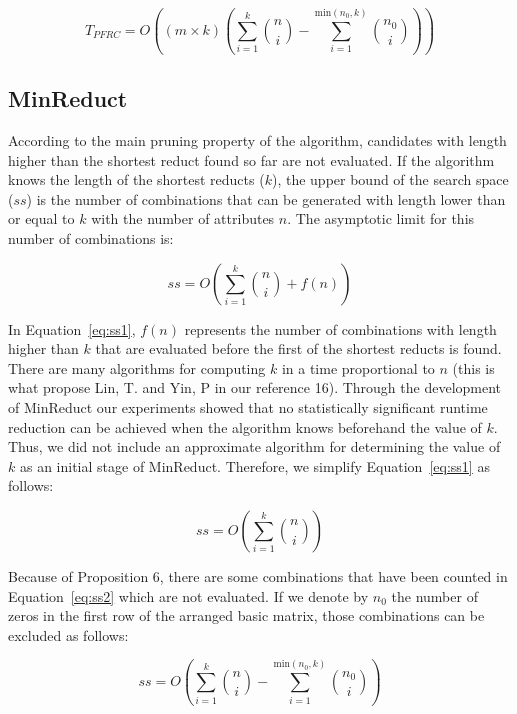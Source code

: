 \documentclass[citenumber]{llncs}
\begin{document}
	\begin{equation}
	T_{PFRC} = O\left((m\times k)\left(\sum_{i=1}^{k} \binom{n}{i} - \sum_{i=1}^{\mathrm{min}(n_0,k)} \binom{n_0}{i}\right)\right)\label{eq:complexPFRC}
	\end{equation}

%	
\subsection{MinReduct}	
%		
	 According to the main pruning property of the algorithm, candidates with length higher than the shortest reduct found so far are not evaluated. If the algorithm knows the length of the shortest reducts ($k$), the upper bound of the search space ($ss$) is the number of combinations that can be generated with length lower than or equal to $k$ with the number of attributes $n$. The asymptotic limit for this number of combinations is: 
	
	\begin{equation}
	ss= O\left( \sum_{i=1}^{k} \binom{n}{i} +f(n)\right)\label{eq:ss1}
	\end{equation}
	
	In Equation~\ref{eq:ss1}, $f(n)$ represents the number of combinations with length higher than $k$ that are evaluated before the first of the shortest reducts is found. There are many algorithms for computing $k$ in a time proportional to $n$ (this is what propose Lin, T. and Yin, P in our reference 16). Through the development of MinReduct our experiments showed that no statistically significant runtime reduction can be achieved when the algorithm knows beforehand the value of $k$. Thus, we did not include an approximate algorithm for determining the value of $k$ as an initial stage of MinReduct. Therefore, we simplify Equation~\ref{eq:ss1} as follows:
	
	\begin{equation}
	ss= O\left( \sum_{i=1}^{k} \binom{n}{i}\right)\label{eq:ss2}
	\end{equation}
	
	Because of Proposition 6, there are some combinations that have been counted in Equation~\ref{eq:ss2} which are not evaluated. If we denote by $n_0$ the number of zeros in the first row of the arranged basic matrix, those combinations can be excluded as follows:	
	
	\begin{equation}
	ss= O\left(\sum_{i=1}^{k} \binom{n}{i} - \sum_{i=1}^{\mathrm{min}(n_0,k)} \binom{n_0}{i}\right)\label{eq:ss3}
	\end{equation}
			
\end{document}
